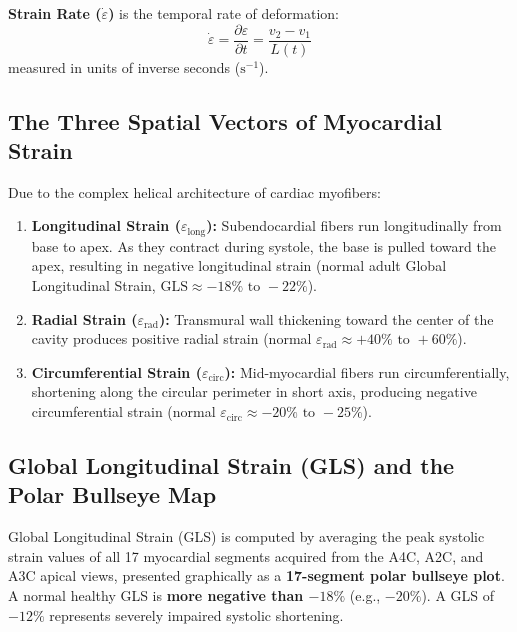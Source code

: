 \documentclass[11pt,a4paper]{article}
\begin{document}
\textbf{Strain Rate ($\dot{\varepsilon}$)} is the temporal rate of deformation:
\begin{equation}
    \dot{\varepsilon} = \frac{\partial \varepsilon}{\partial t} = \frac{v_2 - v_1}{L(t)}
\end{equation}
measured in units of inverse seconds ($\text{s}^{-1}$).

\subsection{The Three Spatial Vectors of Myocardial Strain}

Due to the complex helical architecture of cardiac myofibers:
\begin{enumerate}[leftmargin=*]
    \item \textbf{Longitudinal Strain ($\varepsilon_{\text{long}}$):} Subendocardial fibers run longitudinally from base to apex. As they contract during systole, the base is pulled toward the apex, resulting in negative longitudinal strain (normal adult Global Longitudinal Strain, $\text{GLS} \approx -18\%\text{ to } -22\%$).
    \item \textbf{Radial Strain ($\varepsilon_{\text{rad}}$):} Transmural wall thickening toward the center of the cavity produces positive radial strain (normal $\varepsilon_{\text{rad}} \approx +40\%\text{ to } +60\%$).
    \item \textbf{Circumferential Strain ($\varepsilon_{\text{circ}}$):} Mid-myocardial fibers run circumferentially, shortening along the circular perimeter in short axis, producing negative circumferential strain (normal $\varepsilon_{\text{circ}} \approx -20\%\text{ to } -25\%$).
\end{enumerate}

\subsection{Global Longitudinal Strain (GLS) and the Polar Bullseye Map}

Global Longitudinal Strain (GLS) is computed by averaging the peak systolic strain values of all 17 myocardial segments acquired from the A4C, A2C, and A3C apical views, presented graphically as a \textbf{17-segment polar bullseye plot}. A normal healthy GLS is \textbf{more negative than $-18\%$} (e.g., $-20\%$). A GLS of $-12\%$ represents severely impaired systolic shortening.
\end{document}
